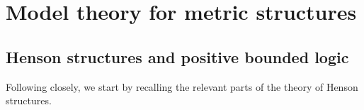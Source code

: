 \documentclass[11pt]{amsart}
\theoremstyle{definition}
\theoremstyle{remark}
\begin{document}
\section{Model theory for metric structures}
\label{sec:model}

\subsection{Henson structures and positive bounded logic}
\label{subsec:metric}
Following \cite{DI2017} closely, we start by recalling the relevant parts of the theory of Henson structures.
\end{document}
